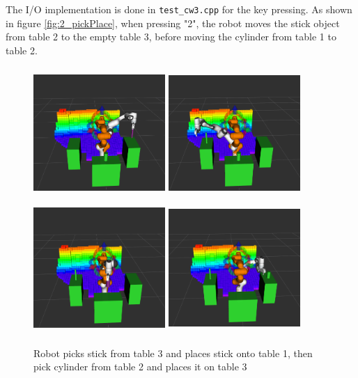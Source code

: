 \documentclass[a4paper,12pt]{article}
\begin{document}
The I/O implementation is done in \texttt{test\_cw3.cpp} for the key pressing. As shown in figure \ref{fig:2_pickPlace}, when pressing "2", the robot moves the stick object from table 2 to the empty table 3, before moving the cylinder from table 1 to table 2.\\

\begin{figure}[H]
    \centering
    \includegraphics[width=5cm, height=5cm]{images/Q3/3_pickStick.png}
    \includegraphics[width=5cm, height=5cm]{images/Q3/3_placeStick.png}\\
    \includegraphics[width=5cm, height=5cm]{images/Q3/3_pickCylinder.png}
    \includegraphics[width=5cm, height=5cm]{images/Q3/3_placeCylinder.png}
    \caption{Robot picks stick from table 3 and places stick onto table 1, then pick cylinder from table 2 and places it on table 3}
    \label{fig:3_pickPlace}
\end{figure}
\end{document}

